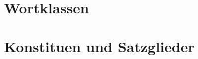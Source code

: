 \documentclass[handout,aspectratio=1610,dvipsnames]{beamer}
\begin{document}
  \section[Wortklassen]{Wortklassen}
  \let\woopsi\section\let\section\subsection\let\subsection\subsubsection
  
  \let\subsection\section\let\section\woopsi

  \section[Konstituenten]{Konstituen und Satzglieder}
  \let\woopsi\section\let\section\subsection\let\subsection\subsubsection
  
  \let\subsection\section\let\section\woopsi
\end{document}
